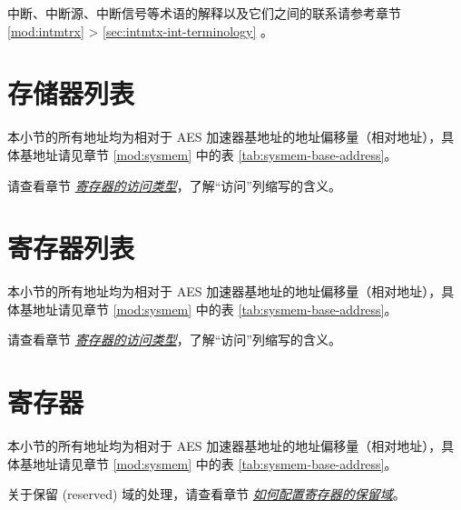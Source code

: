 \documentclass[main\_\_CN.tex]{subfiles}
\begin{document}
\begin{tiplisting}
中断、中断源、中断信号等术语的解释以及它们之间的联系请参考章节 \ref{mod:intmtrx} \textit{} > \ref{sec:intmtx-int-terminology} \textit{}。
\end{tiplisting}


\section{存储器列表}

本小节的所有地址均为相对于 AES 加速器基地址的地址偏移量（相对地址），具体基地址请见章节 \ref{mod:sysmem} \textit{} 中的表 \ref{tab:sysmem-base-address}。

请查看章节 \hyperref[glossary-access-types]{\textit{寄存器的访问类型}}，了解“访问”列缩写的含义。




\hypertarget{aes-reg-summ}{}
\section{寄存器列表}

本小节的所有地址均为相对于 AES 加速器基地址的地址偏移量（相对地址），具体基地址请见章节 \ref{mod:sysmem} \textit{} 中的表 \ref{tab:sysmem-base-address}。

请查看章节 \hyperref[glossary-access-types]{\textit{寄存器的访问类型}}，了解“访问”列缩写的含义。




\clearpage
\section{寄存器}

本小节的所有地址均为相对于 AES 加速器基地址的地址偏移量（相对地址），具体基地址请见章节 \ref{mod:sysmem} \textit{} 中的表 \ref{tab:sysmem-base-address}。

关于保留 (reserved) 域的处理，请查看章节 \hyperref[programming-reserved-field]{\textit{如何配置寄存器的保留域}}。


\end{document}
